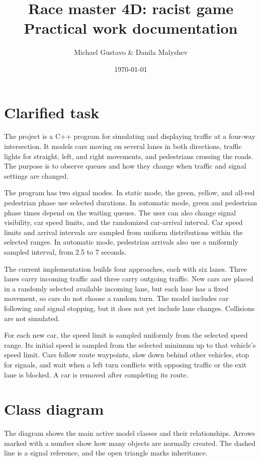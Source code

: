 \documentclass[12pt,a4paper]{article}
\title{Race master 4D: racist game\\[0.3em]
	\large Practical work documentation}
\author{Michael Gustavo \& Danila Malyshev}
\date{\today}
\begin{document}
	
	\maketitle
	
	\section{Clarified task}
	
	The project is a C++ program for simulating and displaying traffic at a
	four-way intersection. It models cars moving on several lanes in both
	directions, traffic lights for straight, left, and right movements, and
	pedestrians crossing the roads. The purpose is to observe queues and how they change when traffic and signal settings are changed.
	
	The program has two signal modes. In static mode, the green, yellow, and
	all-red pedestrian phase use selected durations. In automatic mode, green and
	pedestrian phase times depend on the waiting queues. The user can also change
	signal visibility, car speed limits, and the randomized car-arrival interval.
	Car speed limits and arrival intervals are sampled from uniform distributions
	within the selected ranges. In automatic mode, pedestrian arrivals also use a
	uniformly sampled interval, from 2.5 to 7 seconds.
	
	The current implementation builds four approaches, each with six lanes. Three
	lanes carry incoming traffic and three carry outgoing traffic. New cars are
	placed in a randomly selected available incoming lane, but each lane has a
	fixed movement, so cars do not choose a random turn. The model includes car
	following and signal stopping, but it does not yet include lane changes.
	Collisions are not simulated.
	
	For each new car, the speed limit is sampled uniformly from the selected speed
	range. Its initial speed is sampled from the selected minimum up to that
	vehicle's speed limit. Cars follow route waypoints, slow down behind other
	vehicles, stop for signals, and wait when a left turn conflicts with opposing
	traffic or the exit lane is blocked. A car is removed after completing its
	route.
	
	\section{Class diagram}
	
	The diagram shows the main active model classes and their relationships.
	Arrows marked with a number show how many objects are normally created.
	The dashed line is a signal reference, and the open triangle marks inheritance.
	
\end{document}
